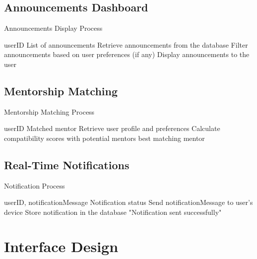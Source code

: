 \subsection{Announcements Dashboard}
\begin{algorithm}[H]
\caption{Announcements Display Process}\label{alg:announcements}
\begin{algorithmic}[1]
\Require userID
\Ensure List of announcements
\State Retrieve announcements from the database
\State Filter announcements based on user preferences (if any)
\State Display announcements to the user
\end{algorithmic}
\end{algorithm}

\subsection{Mentorship Matching}
\begin{algorithm}[H]
\caption{Mentorship Matching Process}\label{alg:mentorship}
\begin{algorithmic}[1]
\Require userID
\Ensure Matched mentor
\State Retrieve user profile and preferences
\State Calculate compatibility scores with potential mentors
\State \Return best matching mentor
\end{algorithmic}
\end{algorithm}

\subsection{Real-Time Notifications}
\begin{algorithm}[H]
\caption{Notification Process}\label{alg:notifications}
\begin{algorithmic}[1]
\Require userID, notificationMessage
\Ensure Notification status
\State Send notificationMessage to user's device
\State Store notification in the database
\State \Return "Notification sent successfully"
\end{algorithmic}
\end{algorithm} 

\section{Interface Design}
\label{sec:interface_design}

